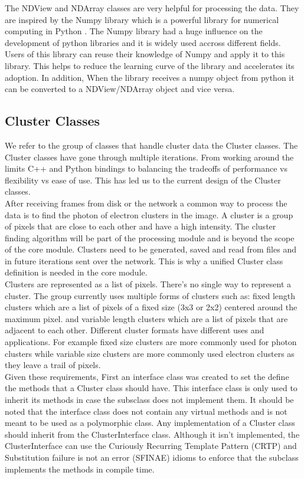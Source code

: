 \documentclass[./chapitre3.tex]{subfiles}
\begin{document}
The NDView and NDArray classes are very helpful for processing the data. They are inspired by the Numpy library
which is a powerful library for numerical computing in Python \cite{harris2020array}. The Numpy library had a huge
influence on the development of python libraries and it is widely used accross different fields.
Users of this library can reuse their knowledge of Numpy and apply it to this library. This helps
to reduce the learning curve of the library and accelerates its adoption.
In addition, When the library receives a numpy object from python it can be converted to a NDView/NDArray object and vice versa. \\

\subsection{Cluster Classes}
We refer to the group of classes that handle cluster data the Cluster classes. The Cluster classes have gone through multiple iterations.
From working around the limits C++ and Python bindings to
balancing the tradeoffs of performance vs flexibility vs ease of use. This has led us to the current design of the Cluster classes.\\

After receiving frames from disk or the network a common way to process the data is to find the photon of electron clusters in
the image. A cluster is a group of pixels that are close to each other and have a high intensity. The cluster finding algorithm
will be part of the processing module and is beyond the scope of the core module. Clusters need to be generated, saved and read from
files and in future iterations sent over the network. This is why a unified Cluster class definition is needed in the core module.\\

Clusters are represented as a list of pixels. There's no single way to represent a cluster. The group currently uses multiple
forms of clusters such as: fixed length clusters which are a list of pixels of a fixed size (3x3 or 2x2) centered around the maximum pixel.
and variable length clusters which are a list of pixels that are adjacent to each other. Different cluster formats have different uses and
applications. For example fixed size clusters are more commonly used for photon clusters while variable size clusters are more commonly used
electron clusters as they leave a trail of pixels.\\

Given these requirements, First an interface class was created to set the define the methods that a Cluster class should have.
This interface class is only used to inherit its methods in case the subsclass does not implement them. It should be
noted that the interface class does not contain any virtual methods and is not meant to be used as a polymorphic
class. Any implementation of a Cluster class should inherit from the ClusterInterface class. Although it isn't
implemented, the ClusterInterface can use the Curiously Recurring Template Pattern (CRTP) and Substitution failure
is not an error (SFINAE) idioms to enforce that the subclass implements the methods in compile time.\\
\end{document}
